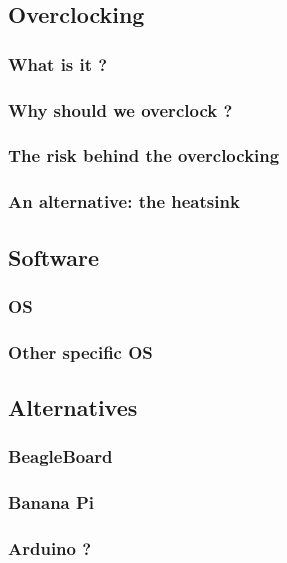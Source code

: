 \documentclass[10pt,a4paper]{article}
\begin{document}
\subsection{Overclocking}

\subsubsection{What is it ?}

\subsubsection{Why should we overclock ?}

\subsubsection{The risk behind the overclocking}

\subsubsection{An alternative: the heatsink}

\subsection{Software}

\subsubsection{OS}

\subsubsection{Other specific OS}

\subsection{Alternatives}

\subsubsection{BeagleBoard}

\subsubsection{Banana Pi}

\subsubsection{Arduino ?}
\end{document}
